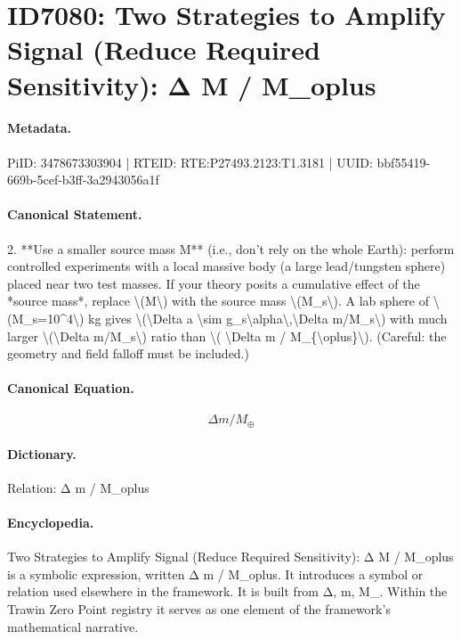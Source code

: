\section*{ID7080: Two Strategies to Amplify Signal (Reduce Required Sensitivity): Δ M / M\_oplus}
\paragraph{Metadata.}
PiID: 3478673303904 | RTEID: RTE:P27493.2123:T1.3181 | UUID: bbf55419-669b-5cef-b3ff-3a2943056a1f

\paragraph{Canonical Statement.}
2. **Use a smaller source mass M** (i.e., don’t rely on the whole Earth): perform controlled experiments with a local massive body (a large lead/tungsten sphere) placed near two test masses. If your theory posits a cumulative effect of the *source mass*, replace \textbackslash{}(M\textbackslash{}) with the source mass \textbackslash{}(M\_s\textbackslash{}). A lab sphere of \textbackslash{}(M\_s=10\textasciicircum{}4\textbackslash{}) kg gives \textbackslash{}(\textbackslash{}Delta a \textbackslash{}sim g\_s\textbackslash{}alpha\textbackslash{},\textbackslash{}Delta m/M\_s\textbackslash{}) with much larger \textbackslash{}(\textbackslash{}Delta m/M\_s\textbackslash{}) ratio than \textbackslash{}( \textbackslash{}Delta m / M\_\{\textbackslash{}oplus\}\textbackslash{}). (Careful: the geometry and field falloff must be included.)

\paragraph{Canonical Equation.}
\[
\Delta m / M_{\oplus}
\]

\paragraph{Dictionary.}
Relation: Δ m / M\_oplus

\paragraph{Encyclopedia.}
Two Strategies to Amplify Signal (Reduce Required Sensitivity): Δ M / M\_oplus is a symbolic expression, written Δ m / M\_oplus. It introduces a symbol or relation used elsewhere in the framework. It is built from Δ, m, M\_. Within the Trawin Zero Point registry it serves as one element of the framework's mathematical narrative.
